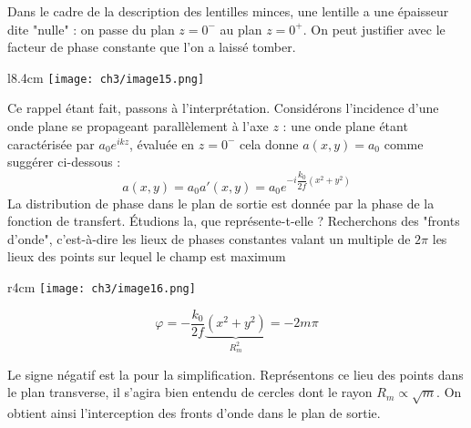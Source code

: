 Dans le cadre de la description des lentilles minces, une lentille a une épaisseur dite "nulle" : on 
passe du plan $z=0^-$ au plan $z=0^+$. On peut justifier avec le facteur de phase constante que l'on a 
laissé tomber. \\

	\begin{wrapfigure}[12]{l}{8.4cm}
	\vspace{-5mm}
	\texttt{[image: ch3/image15.png]}
	\end{wrapfigure}		
Ce rappel étant fait, passons à l'interprétation. Considérons l'incidence d'une onde plane se propageant 
parallèlement à l'axe $z$ : une onde plane étant caractérisée par $a_0e^{ikz}$, évaluée en $z=0^-$ cela 
donne $a(x,y)=a_0$ comme suggérer ci-dessous :
\begin{equation}
a(x,y) = a_0 a'(x,y) = a_0e^{-i\dfrac{k_0}{2f}(x^2+y^2)}
\end{equation}
La distribution de phase dans le plan de sortie est donnée par la phase de la fonction de transfert. 
Étudions la, que représente-t-elle ? Recherchons des "fronts d'onde", c'est-à-dire les lieux de phases 
constantes valant un multiple de $2\pi$ les lieux des points sur lequel le champ est maximum

	\begin{wrapfigure}[12]{r}{4cm}
	\vspace{-5mm}
	\texttt{[image: ch3/image16.png]}
	\end{wrapfigure}	
\begin{equation}
\varphi = -\dfrac{k_0}{2f}\underbrace{(x^2+y^2)}_{R_m^2} = -2m\pi
\end{equation}

Le signe négatif est la pour la simplification. Représentons ce lieu des points dans le plan transverse, 
il s'agira bien entendu de cercles dont le rayon $R_m\propto \sqrt{m}$. On obtient ainsi l'interception
des fronts d'onde dans le plan de sortie.

